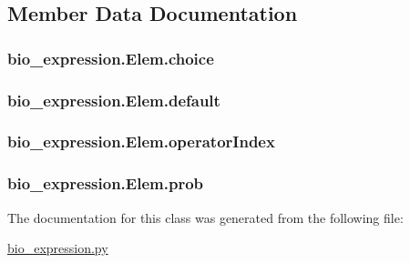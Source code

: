 \subsection{Member Data Documentation}
\hypertarget{classbio__expression_1_1_elem_a024d48dfc32b4486db3e0147bb57f2cf}{
\subsubsection[{choice}]{\setlength{\rightskip}{0pt plus 5cm}bio\+\_\+expression.\+Elem.\+choice}}\label{classbio__expression_1_1_elem_a024d48dfc32b4486db3e0147bb57f2cf}
\hypertarget{classbio__expression_1_1_elem_ae9652f5b42921e03b8623baf034e01be}{
\subsubsection[{default}]{\setlength{\rightskip}{0pt plus 5cm}bio\+\_\+expression.\+Elem.\+default}}\label{classbio__expression_1_1_elem_ae9652f5b42921e03b8623baf034e01be}
\hypertarget{classbio__expression_1_1_elem_a862e4fd7b70af8a2bd3c0db048dc90a5}{
\subsubsection[{operator\+Index}]{\setlength{\rightskip}{0pt plus 5cm}bio\+\_\+expression.\+Elem.\+operator\+Index}}\label{classbio__expression_1_1_elem_a862e4fd7b70af8a2bd3c0db048dc90a5}
\hypertarget{classbio__expression_1_1_elem_a17c61b7da60297dbf7f4164a2a78aa49}{
\subsubsection[{prob}]{\setlength{\rightskip}{0pt plus 5cm}bio\+\_\+expression.\+Elem.\+prob}}\label{classbio__expression_1_1_elem_a17c61b7da60297dbf7f4164a2a78aa49}


The documentation for this class was generated from the following file\+:\begin{DoxyCompactItemize}
\item 
\hyperlink{bio__expression_8py}{bio\+\_\+expression.\+py}\end{DoxyCompactItemize}
